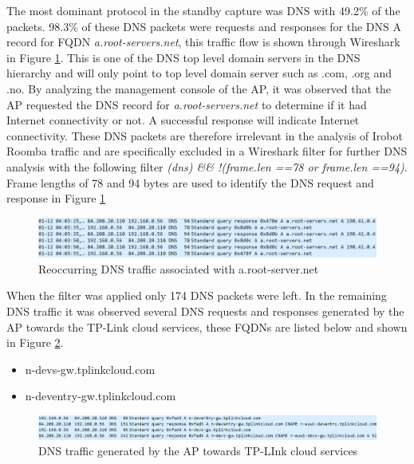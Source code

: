 The most dominant protocol in the standby capture was DNS with 49.2\% of the packets. 98.3\% of these DNS packets were requests and responses for the DNS A record for FQDN \textit{a.root-servers.net}, this traffic flow is shown through Wireshark in Figure \ref{fig:dns_a-root}. This is one of the DNS top level domain servers in the DNS hierarchy and will only point to top level domain server such as .com, .org and .no. By analyzing the management console of the AP, it was observed that the AP requested the DNS record for \textit{a.root-servers.net} to determine if it had Internet connectivity or not. A successful response will indicate Internet connectivity. These DNS packets are therefore irrelevant in the analysis of Irobot Roomba traffic and are specifically excluded in a Wireshark filter for further DNS analysis with the following filter  \textit{(dns) \&\& !(frame.len ==78 or frame.len ==94)}. Frame lengths of 78 and 94 bytes are used to identify the DNS request and response in Figure  \ref{fig:dns_a-root}

\begin{figure}[H]
    \centering
    \includegraphics[width=\textwidth]{figures/DNS_a-root.png}
    \caption{Reoccurring DNS traffic associated with a.root-server.net}
    \label{fig:dns_a-root}
\end{figure}

When the filter was applied only 174 DNS packets were left. In the remaining DNS traffic it was observed several DNS requests and responses generated by the AP towards the TP-Link cloud services, these FQDNs are listed below and shown in Figure \ref{fig:tp-link_fqdn}. 

\begin{itemize}
    \item n-devs-gw.tplinkcloud.com
    \item n-deventry-gw.tplinkcloud.com
\end{itemize}

\begin{figure}[H]
    \centering
    \includegraphics[width=\textwidth]{figures/DNS-tp-link.png}
    \caption{DNS traffic generated by the AP towards TP-LInk cloud services}
    \label{fig:tp-link_fqdn}
\end{figure}

